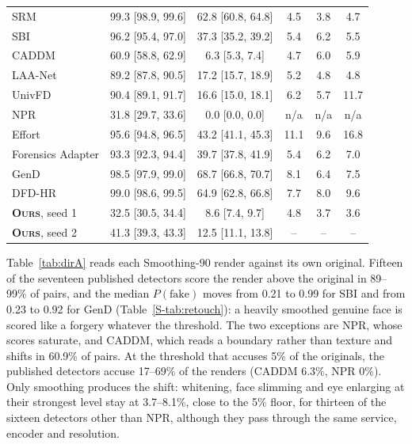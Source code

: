 \documentclass[conference]{IEEEtran}
\newcommand{\ours}{\textsc{Ours}}
\begin{document}
\begin{table}[t]
\begin{tabular}{@{}l cc ccc@{}}
SRM & 99.3 [98.9, 99.6] & 62.8 [60.8, 64.8] & 4.5 & 3.8 & 4.7 \\
SBI & 96.2 [95.4, 97.0] & 37.3 [35.2, 39.2] & 5.4 & 6.2 & 5.5 \\
CADDM & 60.9 [58.8, 62.9] & 6.3 [5.3, 7.4] & 4.7 & 6.0 & 5.9 \\
LAA-Net & 89.2 [87.8, 90.5] & 17.2 [15.7, 18.9] & 5.2 & 4.8 & 4.8 \\
UnivFD & 90.4 [89.1, 91.7] & 16.6 [15.0, 18.1] & 6.2 & 5.7 & 11.7 \\
NPR & 31.8 [29.7, 33.6] & 0.0 [0.0, 0.0] & n/a & n/a & n/a \\
Effort & 95.6 [94.8, 96.5] & 43.2 [41.1, 45.3] & 11.1 & 9.6 & 16.8 \\
Forensics Adapter & 93.3 [92.3, 94.4] & 39.7 [37.8, 41.9] & 5.4 & 6.2 & 7.0 \\
GenD & 98.5 [97.9, 99.0] & 68.7 [66.8, 70.7] & 8.1 & 6.4 & 7.5 \\
DFD-HR & 99.0 [98.6, 99.5] & 64.9 [62.8, 66.8] & 7.7 & 8.0 & 9.6 \\
\midrule
\textbf{\ours{}}, seed 1 & 32.5 [30.5, 34.4] & 8.6 [7.4, 9.7] & 4.8 & 3.7 & 3.6 \\
\textbf{\ours{}}, seed 2 & 41.3 [39.3, 43.3] & 12.5 [11.1, 13.8] & -- & -- & -- \\
\bottomrule
\end{tabular}
\end{table}

Table~\ref{tab:dirA} reads each Smoothing-90 render against its own original. Fifteen of the seventeen published detectors
score the render above the original in 89--99\% of pairs, and the median $P(\text{fake})$ moves from 0.21 to 0.99 for SBI
and from 0.23 to 0.92 for GenD (Table~\ref{S-tab:retouch}):
a heavily smoothed genuine face is scored like a forgery whatever the threshold. The two exceptions are NPR, whose scores
saturate, and CADDM, which reads a boundary rather than texture and shifts in 60.9\% of pairs. At the threshold that accuses
5\% of the originals, the published detectors accuse 17--69\% of the renders (CADDM 6.3\%, NPR 0\%).
Only smoothing produces the shift: whitening, face slimming and eye enlarging at their strongest level stay at 3.7--8.1\%, close to the 5\% floor, for thirteen of the sixteen detectors other than NPR,
although they pass through the same service, encoder and resolution.
\end{document}
